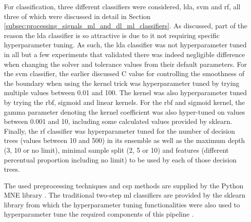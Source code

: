 For classification, three different classifiers were considered, \gls{lda}, \gls{svm} and \gls{rf}, all three of which were discussed in detail in Section \ref{subsec:processing_signals_ml_and_dl_ml_classifiers}.
As discussed, part of the reason the \gls{lda} classifier is so attractive is due to it not requiring specific hyperparameter tuning.
As such, the \gls{lda} classifier was not hyperparameter tuned in all but a few experiments that validated there was indeed negligible difference when changing the solver and tolerance values from their default parameters.
For the \gls{svm} classifier, the earlier discussed C value for controlling the smoothness of the boundary when using the kernel trick was hyperparameter tuned by trying multiple values between 0.01 and 100.
The kernel was also hyperparameter tuned by trying the \gls{rbf}, sigmoid and linear kernels.
For the \gls{rbf} and sigmoid kernel, the gamma parameter denoting the kernel coefficient was also hyper-tuned on values between 0.001 and 10, including some calculated values provided by \gls{sklearn}.
Finally, the \gls{rf} classifier was hyperparameter tuned for the number of decision trees (values between 10 and 500) in its ensemble as well as the maximum depth (3, 10 or no limit), minimal sample split (2, 5 or 10) and features (different percentual proportion including no limit) to be used by each of those decision trees.

The used preprocessing techniques and \gls{csp} methods are supplied by the Python MNE library \citep{mne}.
The traditional two-step \gls{ml} classifiers are provided by the \gls{sklearn} library from which the hyperparameter tuning functionalities were also used to hyperparameter tune the required components of this pipeline \citep{sklearn}.


